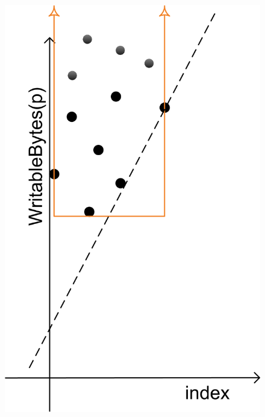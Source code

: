 \documentclass[10pt]{sigplanconf}
\begin{document}
\begin{figure}[t]
{   \includegraphics[scale=.57]{Intervals.png}
   \label{fig:intervals}
   }
\end{figure}
\end{document}
